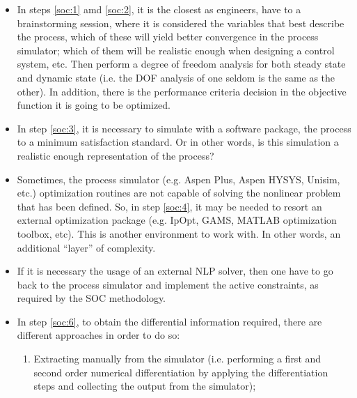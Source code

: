 \documentclass[../msc-thesis.tex]{subfiles}
\begin{document}
\begin{itemize}
    \label{soc:mainsteps}

    \item In steps \ref{soc:1} amd \ref{soc:2}, it is the closest as 
    engineers, have to a brainstorming session, where it is considered the 
    variables that best describe the process, which of these will yield 
    better convergence in the process simulator; which of them will be 
    realistic enough when designing a control system, etc. Then perform a 
    degree of freedom analysis for both steady state and dynamic state 
    (i.e. the DOF analysis of one seldom is the same as the other). In 
    addition, there is the performance criteria decision in the objective 
    function it is going to be optimized.
    
    \item In step \ref{soc:3}, it is necessary to simulate with a software 
    package, the process to a minimum satisfaction standard. Or in other 
    words, is this simulation a realistic enough representation of the process?
    
    \item Sometimes, the process simulator (e.g. Aspen Plus, Aspen HYSYS, 
    Unisim, etc.) optimization routines are not capable of solving the 
    nonlinear problem that has been defined. So, in step \ref{soc:4}, it may 
    be needed to resort an external optimization package (e.g. IpOpt, GAMS, 
    MATLAB\textsuperscript{\textregistered} optimization toolbox, etc). This 
    is another environment to work with. In other words, an additional 
    ``layer'' of complexity.
    
    \item If it is necessary the usage of an external NLP solver, then one 
    have to go back to the process simulator and implement the active 
    constraints, as required by the SOC methodology.
    
    \item In step \ref{soc:6}, to obtain the differential information 
    required, there are different approaches in order to do so:

    \begin{enumerate}
        \item Extracting manually from the simulator (i.e. performing a 
        first and second order numerical differentiation by applying
        the differentiation steps and collecting the output from the 
        simulator); \label{socdiff:1}
        

\end{enumerate}
\end{itemize}
\end{document}
